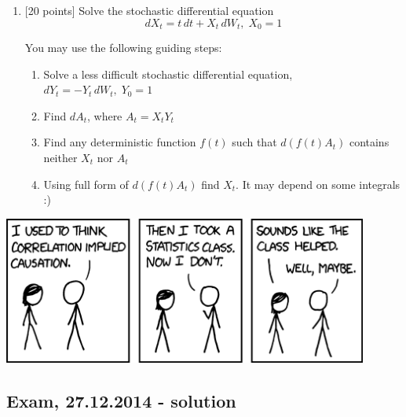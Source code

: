 \documentclass[pdftex,12pt,a4paper]{article}
\begin{document}
\begin{enumerate}
\item $[$20 points] Solve the stochastic differential equation 
\[
dX_t = t \, dt + X_t \, dW_t, \; X_0=1
\]

You may use the following guiding steps:
\begin{enumerate}
\item Solve a less difficult stochastic differential equation, $dY_t=-Y_t \, dW_t, \; Y_0=1$
\item Find $dA_t$, where $A_t=X_t Y_t$ 
\item Find any deterministic function $f(t)$ such that $d(f(t) A_t)$ contains neither $X_t$ nor $A_t$
\item Using full form of $d(f(t) A_t)$ find $X_t$. It may depend on some integrals :)
\end{enumerate}

\end{enumerate}


\begin{center}
\includegraphics[width=12cm]{correlation.png} 
\end{center}


\subsection{Exam, 27.12.2014 - solution}
\end{document}
